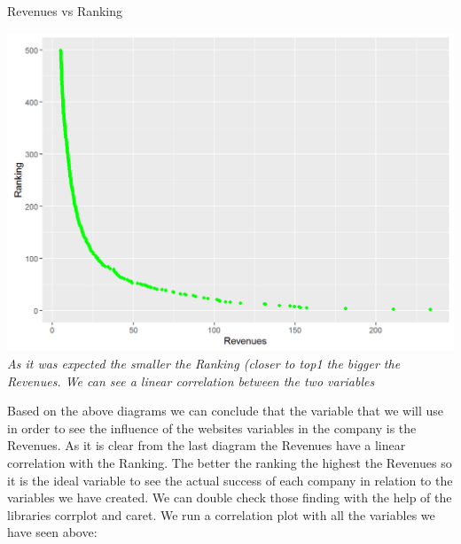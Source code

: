 \documentclass{article}
\begin{document}
\begin{table}[H]
\centering
\caption{Revenues vs Ranking}
\begin{center}
\includegraphics[scale=0.5]{../R/photos/08_rank_rev.png}  \\
\textit{As it was expected the smaller the Ranking (closer to top1 the bigger the Revenues. We can see a linear correlation between the two variables}
\end{center}
\end{table}

Based on the above diagrams we can conclude that the variable that we will use in order to see the influence of the websites variables in the company is the Revenues. As it is clear from the last diagram the Revenues have a linear correlation with the Ranking. The better the ranking the highest the Revenues so it is the ideal variable to see the actual success of each company in relation to the variables we have created. We can double check those finding with the help of the libraries corrplot and caret. We run a correlation plot with all the variables we have seen above:
\end{document}
